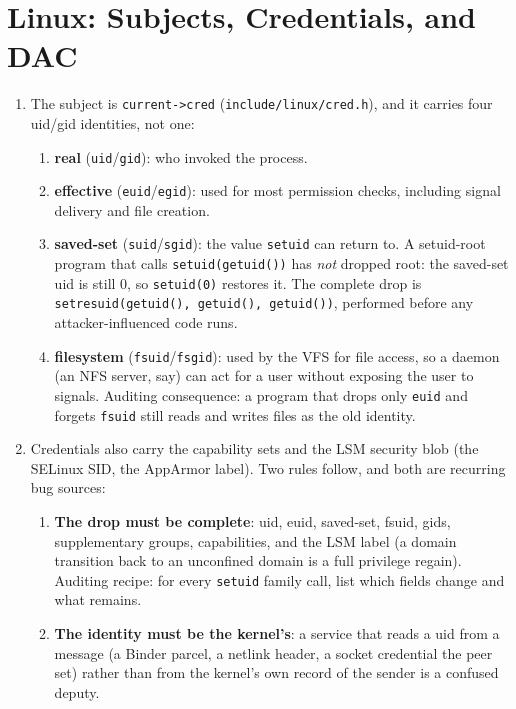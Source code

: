 \documentclass[12pt]{Training}
\begin{document}
\section*{Linux: Subjects, Credentials, and DAC}
\begin{enumerate}
    \item The subject is \lstinline{current->cred} (\lstinline{include/linux/cred.h}), and it carries four uid/gid identities, not one:
    \begin{enumerate}
        \item \textbf{real} (\lstinline{uid}/\lstinline{gid}): who invoked the process.
        \item \textbf{effective} (\lstinline{euid}/\lstinline{egid}): used for most permission checks, including signal delivery and file creation.
        \item \textbf{saved-set} (\lstinline{suid}/\lstinline{sgid}): the value \lstinline{setuid} can return to. A setuid-root program that calls \lstinline{setuid(getuid())} has \emph{not} dropped root: the saved-set uid is still 0, so \lstinline{setuid(0)} restores it. The complete drop is \lstinline{setresuid(getuid(), getuid(), getuid())}, performed before any attacker-influenced code runs.
        \item \textbf{filesystem} (\lstinline{fsuid}/\lstinline{fsgid}): used by the VFS for file access, so a daemon (an NFS server, say) can act for a user without exposing the user to signals. Auditing consequence: a program that drops only \lstinline{euid} and forgets \lstinline{fsuid} still reads and writes files as the old identity.
    \end{enumerate}
    \item Credentials also carry the capability sets and the LSM security blob (the SELinux SID, the AppArmor label). Two rules follow, and both are recurring bug sources:
    \begin{enumerate}
        \item \textbf{The drop must be complete}: uid, euid, saved-set, fsuid, gids, supplementary groups, capabilities, and the LSM label (a domain transition back to an unconfined domain is a full privilege regain). Auditing recipe: for every \lstinline{setuid} family call, list which fields change and what remains.
        \item \textbf{The identity must be the kernel's}: a service that reads a uid from a message (a Binder parcel, a netlink header, a socket credential the peer set) rather than from the kernel's own record of the sender is a confused deputy.

\end{enumerate}
\end{enumerate}
\end{document}
